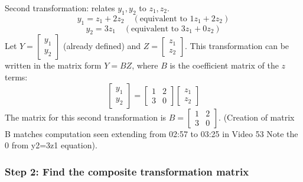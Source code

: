 \documentclass{article}
\begin{document}
Second transformation: relates $y_1, y_2$ to $z_1, z_2$.
\[ y_1 = z_1 + 2z_2 \quad (\text{equivalent to } 1z_1 + 2z_2) \]
\[ y_2 = 3z_1 \quad (\text{equivalent to } 3z_1 + 0z_2) \] %
Let $Y = \begin{bmatrix} y_1 \\ y_2 \end{bmatrix}$ (already defined) and $Z = \begin{bmatrix} z_1 \\ z_2 \end{bmatrix}$.
This transformation can be written in the matrix form $Y = BZ$, where $B$ is the coefficient matrix of the $z$ terms:
\[ \begin{bmatrix} y_1 \\ y_2 \end{bmatrix} = \begin{bmatrix} 1 & 2 \\ 3 & 0 \end{bmatrix} \begin{bmatrix} z_1 \\ z_2 \end{bmatrix} \]
The matrix for this second transformation is $B = \begin{bmatrix} 1 & 2 \\ 3 & 0 \end{bmatrix}$. %
(Creation of matrix B matches computation seen extending from 02:57 to 03:25 in Video 53 Note the 0 from y2=3z1 equation).

\subsubsection*{Step 2: Find the composite transformation matrix}
\end{document}
